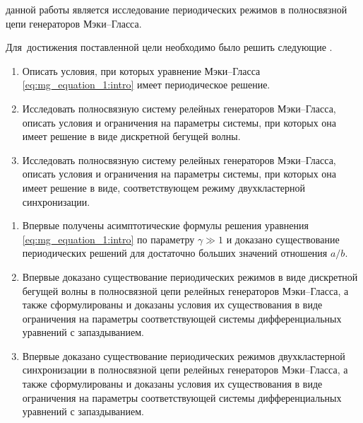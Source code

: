 
{\aim} данной работы является исследование периодических режимов в полносвязной цепи генераторов Мэки--Гласса.

Для~достижения поставленной цели необходимо было решить следующие {\tasks}.
\begin{enumerate}[beginpenalty=10000] %
	\item Описать условия, при которых уравнение Мэки--Гласса \eqref{eq:mg_equation_1:intro} имеет периодическое решение.
	\item Исследовать полносвязную систему релейных генераторов Мэки--Гласса, описать условия и ограничения на параметры системы, при которых она имеет решение в виде дискретной бегущей волны.
	\item Исследовать полносвязную систему релейных генераторов Мэки--Гласса, описать условия и ограничения на параметры системы, при которых она имеет решение в виде, соответствующем режиму двухкластерной синхронизации.
\end{enumerate}


{\novelty}
\begin{enumerate}[beginpenalty=10000] %
  \item Впервые получены асимптотические формулы решения уравнения \eqref{eq:mg_equation_1:intro} по параметру $\gamma \gg 1$ и доказано существование периодических решений для достаточно больших значений отношения $a / b$.
  \item Впервые доказано существование периодических режимов в виде дискретной бегущей волны в полносвязной цепи релейных генераторов Мэки--Гласса, а также сформулированы и доказаны условия их существования в виде ограничения на параметры соответствующей системы дифференциальных уравнений с запаздыванием.
  \item Впервые доказано существование периодических режимов двухкластерной синхронизации в полносвязной цепи релейных генераторов Мэки--Гласса, а также сформулированы и доказаны условия их существования в виде ограничения на параметры соответствующей системы дифференциальных уравнений с запаздыванием.
\end{enumerate}

